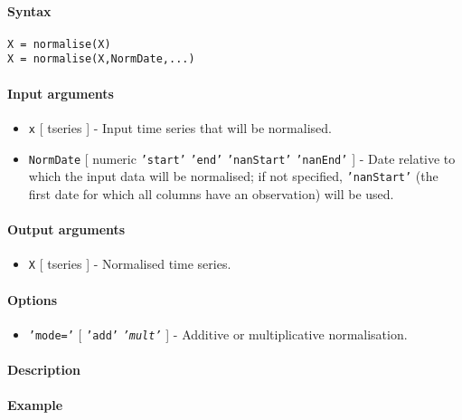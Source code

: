 


	\paragraph{Syntax}

\begin{verbatim}
X = normalise(X)
X = normalise(X,NormDate,...)
\end{verbatim}

\paragraph{Input arguments}

\begin{itemize}
\item
  \texttt{x} {[} tseries {]} - Input time series that will be
  normalised.
\item
  \texttt{NormDate} {[} numeric \textbar{} \texttt{'start'} \textbar{}
  \texttt{'end'} \textbar{} \texttt{'nanStart'} \textbar{}
  \texttt{'nanEnd'} {]} - Date relative to which the input data will be
  normalised; if not specified, \texttt{'nanStart'} (the first date for
  which all columns have an observation) will be used.
\end{itemize}

\paragraph{Output arguments}

\begin{itemize}
\itemsep1pt\parskip0pt
\item
  \texttt{X} {[} tseries {]} - Normalised time series.
\end{itemize}

\paragraph{Options}

\begin{itemize}
\itemsep1pt\parskip0pt
\item
  \texttt{'mode='} {[} \texttt{'add'} \textbar{} \emph{\texttt{'mult'}}
  {]} - Additive or multiplicative normalisation.
\end{itemize}

\paragraph{Description}

\paragraph{Example}


